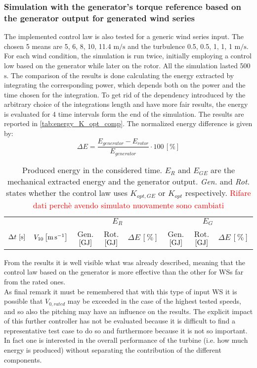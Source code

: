 \subsubsection{Simulation with the generator's torque reference based on the generator output for generated wind series}
The implemented control law is also tested for a generic wind series input. The chosen 5 means are 5, 6, 8, 10, 11.4 $\si{\meter\per\second}$ and the turbulence 0.5, 0.5, 1, 1, 1 $\si{\meter\per\second}$. For each wind condition, the simulation is run twice, initially employing a control low based on the generator while later on the rotor. All the simulation lasted 500 $\si{\second}$. The comparison of the results is done calculating the energy extracted by integrating the corresponding power, which depends both on the power and the time chosen for the integration. To get rid of the dependency introduced by the arbitrary choice of the integrations length and have more fair results, the energy is evaluated for 4 time intervals form the end of the simulation. The results are reported in \autoref{tab:energy_K_opt_comp}. The normalized energy difference is given by:
\begin{equation}
  \Delta E = \frac{E_{generator} - E_{rotor}}{E_{generator}}\cdot 100 \, \left[\%\right]
\end{equation}

\begin{table}[htb]
  \centering
  \caption{Produced energy in the considered time. $E_R$ and $E_{GE}$ are the mechanical extracted energy and the generator output. \textit{Gen.} and \textit{Rot.} states whether the control law uses $K_{opt,GE}$ or $K_{opt}$ respectively. \textcolor{Red}{Rifare dati perchè avendo simulato nuovamente sono cambiati}}
  \begin{tabular}{cc|ccc|ccc}
    \toprule
    & & \multicolumn{3}{c}{$E_R$} & \multicolumn{3}{|c}{$E_G$} \\
     $\Delta t \,\left[\si{\second}\right]$ &  $V_{10} \left[\si{\meter\per\second}\right]$ & Gen. $\left[\si{\giga\joule}\right]$ & Rot. $\left[\si{\giga\joule}\right]$ & $\Delta E \, \left[\%\right]$ & Gen. $\left[\si{\giga\joule}\right]$ & Rot. $\left[\si{\giga\joule}\right]$ & $\Delta E \, \left[\%\right]$ \\ \midrule
    
  \end{tabular}
  \label{tab:energy_K_opt_comp}
\end{table}

From the results it is well visible what was already described, meaning that the control law based on the generator is more effective than the other for WSs far from the rated ones. \\
As final remark it must be remembered that with this type of input WS it is possible that $V_{0,rated}$ may be exceeded in the case of the highest tested speeds, and so also the pitching may have an influence on the results. The explicit impact of this further controller has not be evaluated because it is difficult to find a representative test case to do so and furthermore because it is not so important. In fact one is interested in the overall performance of the turbine (i.e. how much energy is produced) without separating the contribution of the different components. 

